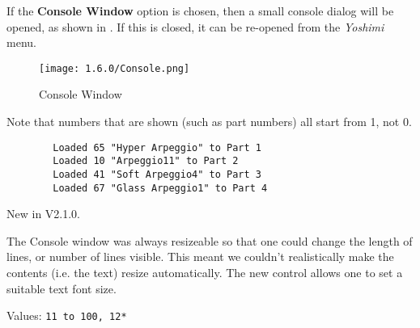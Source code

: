    If the \textbf{Console Window} option is chosen, then a small console dialog
   will be opened, as shown in . If this is closed,
   it can be re-opened from the \textsl{Yoshimi} menu.

\begin{figure}[H]
   \centering
   \texttt{[image: 1.6.0/Console.png]}
   \caption[Yoshimi Console Window]{Console Window}
   \label{fig:console_window}
\end{figure}

   Note that numbers that are shown (such as part numbers) all start from 1,
   not 0.

   \begin{verbatim}
		Loaded 65 "Hyper Arpeggio" to Part 1
		Loaded 10 "Arpeggio11" to Part 2
		Loaded 41 "Soft Arpeggio4" to Part 3
		Loaded 67 "Glass Arpeggio1" to Part 4
   \end{verbatim}

   New in V2.1.0.

   The Console window was always resizeable so that one could change the length
   of lines, or number of lines visible. This meant we couldn't realistically
   make the contents (i.e. the text) resize automatically. The new control allows
   one to set a suitable text font size.

   Values: \texttt{11 to 100, 12*}




